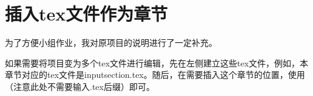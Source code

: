 \section{插入tex文件作为章节}
为了方便小组作业，我对原项目的说明进行了一定补充。\par
如果需要将项目变为多个tex文件进行编辑，先在左侧建立这些tex文件，例如，本章节对应的tex文件是inputsection.tex。随后，在需要插入这个章节的位置，使用\verb||（注意此处不需要输入.tex后缀）即可。